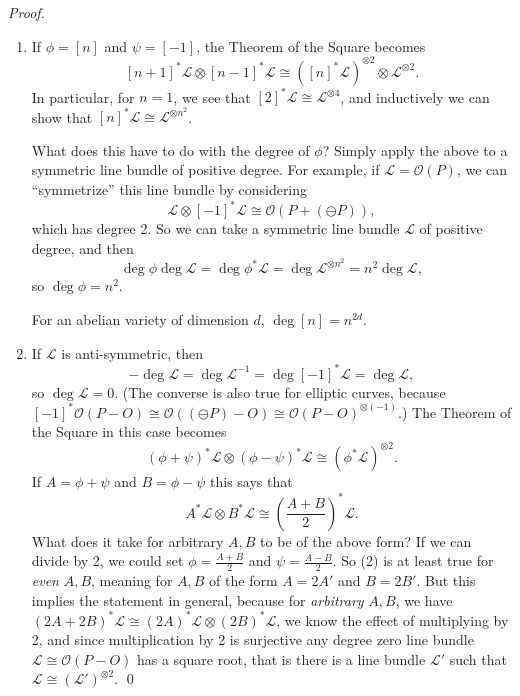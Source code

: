 \textit{Proof.}
\begin{enumerate}
\item If \( \phi = [n] \) and \( \psi = [-1] \), the Theorem of the Square becomes
  \[ [n+1]^*\mathcal{L} \otimes [n-1]^* \mathcal{L} \cong ([n]^* \mathcal{L})^{\otimes 2} \otimes \mathcal{L}^{\otimes 2} . \]
  In particular, for \( n = 1 \), we see that
  \( [2]^* \mathcal{L} \cong \mathcal{L}^{\otimes 4} \),
  and inductively we can show that \( [n]^* \mathcal{L} \cong \mathcal{L}^{\otimes n^2} \).

  What does this have to do with the degree of \( \phi \)? Simply apply the above to a symmetric line bundle of positive degree. For example, if \( \mathcal{L} = \mathcal{O}(P) \), we can ``symmetrize'' this line bundle by considering
  \[ \mathcal{L} \otimes [-1]^* \mathcal{L} \cong \mathcal{O} \left( P + \left( \ominus P \right) \right) , \]
  which has degree 2. So we can take a symmetric line bundle \( \mathcal{L} \) of positive degree, and then
  \[ \operatorname{deg} \phi \operatorname{deg} \mathcal{L} = \operatorname{deg} \phi^* \mathcal{L} = \operatorname{deg} \mathcal{L}^{\otimes n^2} = n^2 \operatorname{deg} \mathcal{L}, \]
  so \( \operatorname{deg} \phi = n^2 \).
  \begin{remark}
    For an abelian variety of dimension \( d \), \( \operatorname{deg} [n] = n^{2d} \).
  \end{remark}
\item If \( \mathcal{L} \) is anti-symmetric, then
  \[ - \operatorname{deg} \mathcal{L} = \operatorname{deg} \mathcal{L}^{-1} = \operatorname{deg}[-1]^* \mathcal{L} = \operatorname{deg} \mathcal{L} , \]
  so \( \operatorname{deg} \mathcal{L} = 0 \).
  (The converse is also true for elliptic curves, because \( [-1]^* \mathcal{O}(P-O) \cong \mathcal{O}((\ominus P)-O) \cong \mathcal{O}(P-O)^{\otimes (-1)} . \))
  The Theorem of the Square in this case becomes
  \[ (\phi + \psi)^* \mathcal{L} \otimes (\phi - \psi)^* \mathcal{L} \cong (\phi^* \mathcal{L})^{\otimes 2} . \]
  If \( A = \phi + \psi \) and \( B = \phi - \psi \) this says that
  \[ A^* \mathcal{L} \otimes B^* \mathcal{L} \cong \left( \frac{A+B}{2} \right)^* \mathcal{L} . \]
  What does it take for arbitrary \( A,B \) to be of the above form? If we can divide by 2, we could set \( \phi = \frac{A+B}{2} \) and \( \psi = \frac{A-B}{2} \).
  So (2) is at least true for \textit{even} \( A,B \), meaning for \( A,B \) of the form \( A = 2 A' \) and \( B = 2B' \).
  But this implies the statement in general, because for \textit{arbitrary} \( A,B \), we have \( (2A+2B)^* \mathcal{L} \cong (2A)^* \mathcal{L} \otimes (2B)^* \mathcal{L} \), we know the effect of multiplying by 2, and since multiplication by 2 is surjective any degree zero line bundle \( \mathcal{L} \cong \mathcal{O}\left( P-O \right) \) has a square root, that is there is a line bundle \( \mathcal{L}' \) such that \( \mathcal{L} \cong \left( \mathcal{L}' \right)^{\otimes 2} \). \qed
\end{enumerate}


